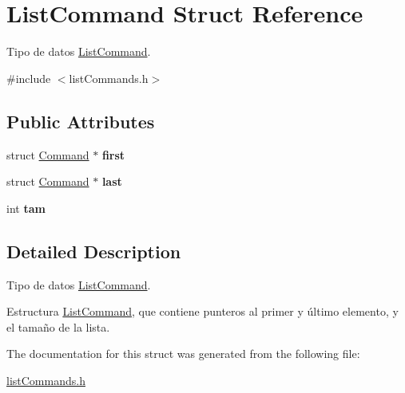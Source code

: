 \hypertarget{structListCommand}{\section{List\-Command Struct Reference}
\label{structListCommand}
}


Tipo de datos \hyperlink{structListCommand}{List\-Command}.  




{\ttfamily \#include $<$list\-Commands.\-h$>$}

\subsection*{Public Attributes}
\begin{DoxyCompactItemize}
\item 
\hypertarget{structListCommand_abaa6cdf6254b84006e328ac20ade2a51}{struct \hyperlink{structCommand}{Command} $\ast$ {\bfseries first}}\label{structListCommand_abaa6cdf6254b84006e328ac20ade2a51}

\item 
\hypertarget{structListCommand_a7ca26c8e0438819f6e9f2af1e187180a}{struct \hyperlink{structCommand}{Command} $\ast$ {\bfseries last}}\label{structListCommand_a7ca26c8e0438819f6e9f2af1e187180a}

\item 
\hypertarget{structListCommand_abd56a2e1c8af2c65a2c2344c55338a74}{int {\bfseries tam}}\label{structListCommand_abd56a2e1c8af2c65a2c2344c55338a74}

\end{DoxyCompactItemize}


\subsection{Detailed Description}
Tipo de datos \hyperlink{structListCommand}{List\-Command}. 

Estructura \hyperlink{structListCommand}{List\-Command}, que contiene punteros al primer y último elemento, y el tamaño de la lista. 

The documentation for this struct was generated from the following file\-:\begin{DoxyCompactItemize}
\item 
\hyperlink{listCommands_8h}{list\-Commands.\-h}\end{DoxyCompactItemize}
